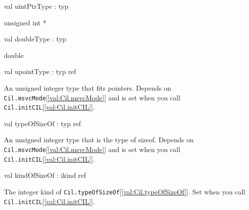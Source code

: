 \documentclass[11pt]{article}
\begin{document}
\label{val:Cil.uintPtrType}\begin{ocamldoccode}
val uintPtrType : typ
\end{ocamldoccode}
\begin{ocamldocdescription}
unsigned int *


\end{ocamldocdescription}




\label{val:Cil.doubleType}\begin{ocamldoccode}
val doubleType : typ
\end{ocamldoccode}
\begin{ocamldocdescription}
double


\end{ocamldocdescription}




\label{val:Cil.upointType}\begin{ocamldoccode}
val upointType : typ ref
\end{ocamldoccode}
\begin{ocamldocdescription}
An unsigned integer type that fits pointers. Depends on {\tt{Cil.msvcMode}}[\ref{val:Cil.msvcMode}] 
  and is set when you call {\tt{Cil.initCIL}}[\ref{val:Cil.initCIL}].


\end{ocamldocdescription}




\label{val:Cil.typeOfSizeOf}\begin{ocamldoccode}
val typeOfSizeOf : typ ref
\end{ocamldoccode}
\begin{ocamldocdescription}
An unsigned integer type that is the type of sizeof. Depends on 
 {\tt{Cil.msvcMode}}[\ref{val:Cil.msvcMode}] and is set when you call {\tt{Cil.initCIL}}[\ref{val:Cil.initCIL}].


\end{ocamldocdescription}




\label{val:Cil.kindOfSizeOf}\begin{ocamldoccode}
val kindOfSizeOf : ikind ref
\end{ocamldoccode}
\begin{ocamldocdescription}
The integer kind of {\tt{Cil.typeOfSizeOf}}[\ref{val:Cil.typeOfSizeOf}]. 
  Set when you call {\tt{Cil.initCIL}}[\ref{val:Cil.initCIL}].


\end{ocamldocdescription}
\end{document}
